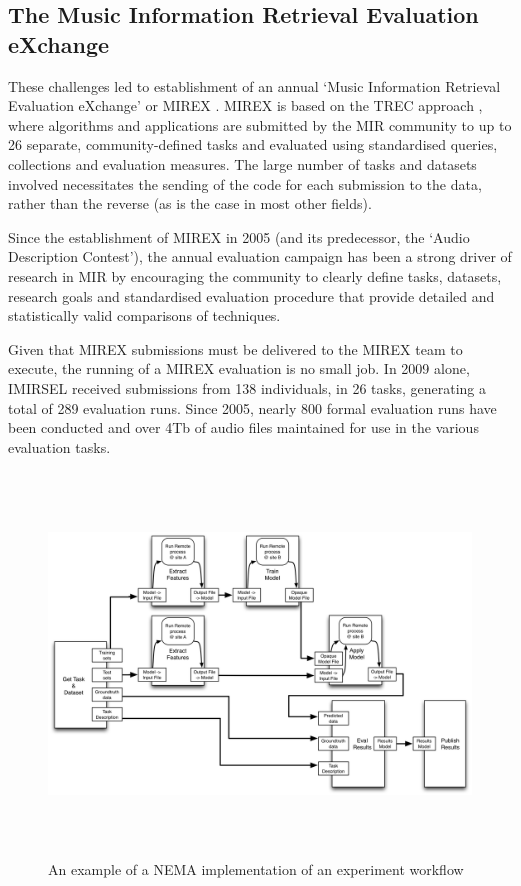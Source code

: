 \documentclass[conference]{IEEEtran}
\begin{document}
\subsection{The Music Information Retrieval Evaluation eXchange}
These challenges led to establishment of an annual `Music Information Retrieval Evaluation eXchange'  or MIREX  \cite{downie2008mirex}. MIREX is based on the TREC approach \cite{taguesutcliffe1995sat}, where algorithms and applications are submitted by the MIR community to up to 26 separate, community-defined tasks and evaluated using standardised queries, collections and evaluation measures. The large number of tasks and datasets involved necessitates the sending of the code for each submission to the data, rather than the reverse (as is the case in most other fields). 

Since the establishment of MIREX in 2005 (and its predecessor, the `Audio Description Contest'), the annual evaluation campaign has been a strong driver of research in MIR by encouraging the community to clearly define tasks, datasets, research goals and standardised evaluation procedure that provide detailed and statistically valid comparisons of techniques.

Given that MIREX submissions must be delivered to the MIREX team to execute, the running of a MIREX evaluation is no small job. In 2009 alone, IMIRSEL received submissions from 138 individuals, in 26 tasks, generating a total of 289 evaluation runs.  Since 2005, nearly 800 formal evaluation runs have been conducted and over 4Tb of audio files maintained for use in the various evaluation tasks. 

\begin{figure}[t]
\centering
\includegraphics[height=4in]{flow_example}
  \caption{An example of a NEMA implementation of an experiment workflow}
\label{fig_flow}
\end{figure}
\end{document}
